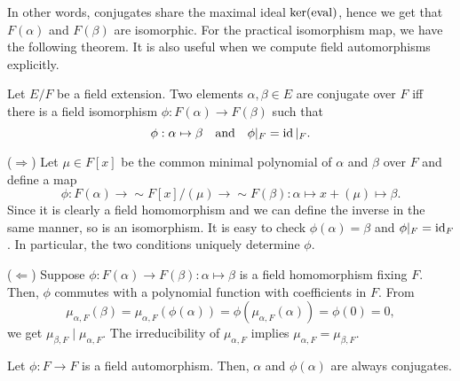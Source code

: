 \documentclass{../exp}
\begin{document}
In other words, conjugates share the maximal ideal $\ker(\operatorname{eval})$, hence we get that $F(\alpha)$ and $F(\beta)$ are isomorphic.
For the practical isomorphism map, we have the following theorem.
It is also useful when we compute field automorphisms explicitly.

\begin{thm}
Let $E/F$ be a field extension.
Two elements $\alpha,\beta\in E$ are conjugate over $F$ iff there is a field isomorphism $\phi:F(\alpha)\to F(\beta)$ such that
\[\phi:\alpha\mapsto\beta\quad\text{and}\quad\phi|_F=\operatorname{id}|_F.\]
\end{thm}
\begin{pf}
($\Rightarrow$)
Let $\mu\in F[x]$ be the common minimal polynomial of $\alpha$ and $\beta$ over $F$ and define a map
\[\phi:F(\alpha)\to{\sim}F[x]/(\mu)\to{\sim}F(\beta):\alpha\mapsto x+(\mu)\mapsto\beta.\]
Since it is clearly a field homomorphism and we can define the inverse in the same manner, so is an isomorphism.
It is easy to check $\phi(\alpha)=\beta$ and $\phi|_F=\operatorname{id}_F$.
In particular, the two conditions uniquely determine $\phi$.

($\Leftarrow$)
Suppose $\phi:F(\alpha)\to F(\beta):\alpha\mapsto\beta$ is a field homomorphism fixing $F$.
Then, $\phi$ commutes with a polynomial function with coefficients in $F$.
From
\[\mu_{\alpha,F}(\beta)=\mu_{\alpha,F}(\phi(\alpha))=\phi(\mu_{\alpha,F}(\alpha))=\phi(0)=0,\]
we get $\mu_{\beta,F}\mid\mu_{\alpha,F}$.
The irreducibility of $\mu_{\alpha,F}$ implies $\mu_{\alpha,F}=\mu_{\beta,F}$.
\end{pf}
\begin{cor}
Let $\phi:F\to F$ is a field automorphism.
Then, $\alpha$ and $\phi(\alpha)$ are always conjugates.
\end{cor}
\end{document}
